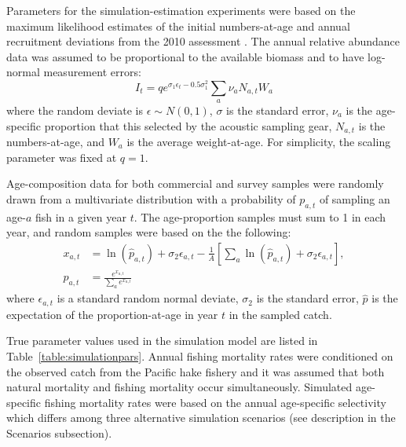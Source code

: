 Parameters for the simulation-estimation experiments were based on the maximum likelihood estimates of the initial numbers-at-age and annual recruitment deviations from the 2010 assessment  \citep{Martell2009}. The annual relative abundance data was assumed to be proportional to the available biomass and to have log-normal measurement errors:
\begin{equation}\label{eq:surveyIndex}
	I_t = q e^{\sigma_1\epsilon_t - 0.5\sigma_1^2} \sum_a \nu_a N_{a,t}  W_a 
\end{equation}
where the random deviate is $\epsilon \sim N(0,1)$, $\sigma$ is the standard error, $\nu_a$ is the age-specific proportion that this selected by the acoustic sampling gear, $N_{a,t}$ is the numbers-at-age, and $W_a$ is the average weight-at-age.  For simplicity, the scaling parameter was fixed at $q=1$.

Age-composition data for both commercial and survey samples were randomly drawn from a multivariate distribution with a probability of $p_{a,t}$ of sampling an age-$a$ fish in a given year $t$.  The age-proportion samples must sum to 1 in each year, and random samples were based on the the following:
\begin{align}
	x_{a,t} &= \ln(\hat{p}_{a,t}) + \sigma_2 \epsilon_{a,t} - \frac{1}{A}
	\left[\sum_a \ln(\hat{p}_{a,t}) + \sigma_2 \epsilon_{a,t} \right],\nonumber \\ 
	p_{a,t} &= \frac{e^{x_{a,t}}}{\sum_a e^{x_{a,t}} } \label{eq:ageProportion}
\end{align}
where $\epsilon_{a,t}$ is a standard random normal deviate, $\sigma_2$ is the standard error, $\hat{p}$ is the expectation of the proportion-at-age in year $t$ in the sampled catch.

True parameter values used in the simulation model are listed in Table~\ref{table:simulationpars}.  Annual fishing mortality rates were conditioned on the observed catch from the Pacific hake fishery and it was assumed that both natural mortality and fishing mortality occur simultaneously.  Simulated age-specific fishing mortality rates were based on the annual age-specific selectivity which differs among three alternative simulation scenarios (see description in the Scenarios subsection).

